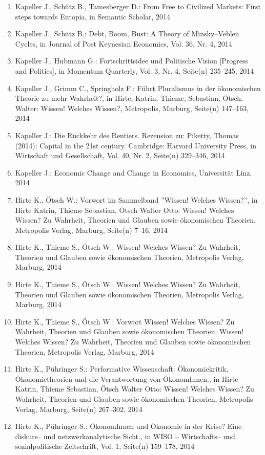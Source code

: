 \begin{enumerate}
	 \item Kapeller J., Schütz B., Tamesberger D.: From Free to Civilized Markets: First steps towards Eutopia, in Semantic Scholar, 2014
	 \item Kapeller J., Schütz B.: Debt, Boom, Bust: A Theory of Minsky--Veblen Cycles, in Journal of Post Keynesian Economics, Vol. 36, Nr. 4, 2014
	 \item Kapeller J., Hubmann G.: Fortschrittsidee und Politische Vision [Progress and Politics], in Momentum Quarterly, Vol. 3, Nr. 4, Seite(n) 235--245, 2014
	 \item Kapeller J., Grimm C., Springholz F.: Führt Pluralismus in der ökonomischen Theorie zu mehr Wahrheit?, in Hirte, Katrin, Thieme, Sebastian, Ötsch, Walter: Wissen! Welches Wissen?, Metropolis, Marburg, Seite(n) 147--163, 2014
	 \item Kapeller J.: Die Rückkehr des Rentiers. Rezension zu: Piketty, Thomas (2014): Capital in the 21st century. Cambridge: Harvard University Press, in Wirtschaft und Gesellschaft, Vol. 40, Nr. 2, Seite(n) 329--346, 2014
	 \item Kapeller J.: Economic Change and Change in Economics, Universität Linz, 2014
	 \item Hirte K., Ötsch W.: Vorwort im Sammelband ''Wissen! Welches Wissen?'', in Hirte Katrin, Thieme Sebastian, Ötsch Walter Otto: Wissen! Welches Wissen? Zu Wahrheit, Theorien und Glauben sowie ökonomischen Theorien, Metropolis Verlag, Marburg, Seite(n) 7--16, 2014
	 \item Hirte K., Thieme S., Ötsch W.: Wissen! Welches Wissen? Zu Wahrheit, Theorien und Glauben sowie ökonomischen Theorien, Metropolis Verlag, Marburg, 2014
	 \item Hirte K., Thieme S., Ötsch W.: Wissen! Welches Wissen? Zu Wahrheit, Theorien und Glauben sowie ökonomischen Theorien, Metropolis Verlag, Marburg, 2014
	 \item Hirte K., Thieme S., Ötsch W.: Vorwort Wissen! Welches Wissen? Zu Wahrheit, Theorien und Glauben sowie ökonomischen Theorien: Wissen! Welches Wissen? Zu Wahrheit, Theorien und Glauben sowie ökonomischen Theorien, Metropolis Verlag, Marburg, 2014
	 \item Hirte K., Pühringer S.: Performative Wissenschaft: Ökonomiekritik, Ökonomietheorien und die Verantwortung von ÖkonomInnen., in Hirte Katrin, Thieme Sebastian, Ötsch Walter Otto: Wissen! Welches Wissen? Zu Wahrheit, Theorien und Glauben sowie ökonomischen Theorien, Metropolis Verlag, Marburg, Seite(n) 267--302, 2014
	 \item Hirte K., Pühringer S.: ÖkonomInnen und Ökonomie in der Krise? Eine diskurs-- und netzwerkanalytische Sicht., in WISO -- Wirtschafts-- und sozialpolitische Zeitschrift, Vol. 1, Seite(n) 159--178, 2014

\end{enumerate}
